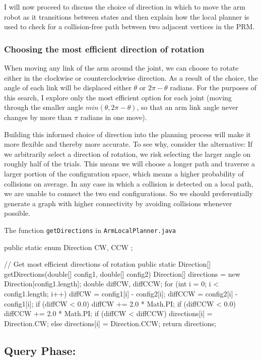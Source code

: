 \documentclass{article}
\begin{document}
I will now proceed to discuss the choice of direction in which to move the arm robot as it transitions between states and then explain how the local planner is used to check for a collision-free path between two adjacent vertices in the PRM.

\subsubsection{Choosing the most efficient direction of rotation}
When moving any link of the arm around the joint, we can choose to rotate either in the clockwise or counterclockwise direction. As a result of the choice, the angle of each link will be displaced either $\theta$ or $2\pi - \theta$ radians. For the purposes of this search, I explore only the most efficient option for each joint (moving through the smaller angle $min(\theta, 2\pi - \theta)$, so that an arm link angle never changes by more than $\pi$ radians in one move).

Building this informed choice of direction into the planning process will make it more flexible and thereby more accurate. To see why, consider the alternative: If we arbitrarily select a direction of rotation, we risk selecting the larger angle on roughly half of the trials. This means we will choose a longer path and traverse a larger portion of the configuration space, which means a higher probability of collisions on average. In any case in which a collision is detected on a local path, we are unable to connect the two end configurations. So we should preferentially generate a graph with higher connectivity by avoiding collisions whenever possible. 

The function \verb`getDirections` in \verb`ArmLocalPlanner.java`

	public static enum Direction { CW, CCW };
	
	// Get most efficient directions of rotation
	public static Direction[] getDirections(double[] config1, double[] config2) {
		Direction[] directions = new Direction[config1.length];
		double diffCW, diffCCW;
		for (int i = 0; i < config1.length; i++) {
			diffCW = config1[i] - config2[i];
			diffCCW = config2[i] - config1[i];
			if (diffCW < 0.0) { diffCW += 2.0 * Math.PI; }
			if (diffCCW < 0.0) { diffCCW += 2.0 * Math.PI; }
			if (diffCW < diffCCW) {
				directions[i] = Direction.CW;
			} else {
				directions[i] = Direction.CCW;
			}
		}
		return directions;
	}

\subsection{Query Phase: }
\end{document}
